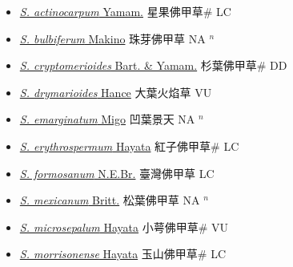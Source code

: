\begin{itemize}
  \begin{itemize}
        \item[] \href{http://www.theplantlist.org/tpl1.1/search?q=Sedum+actinocarpum}{\textit{S. actinocarpum} Yamam.}   星果佛甲草\# LC
        \item[] \href{http://www.theplantlist.org/tpl1.1/search?q=Sedum+bulbiferum}{\textit{S. bulbiferum} Makino}   珠芽佛甲草 NA $^n$
        \item[] \href{http://www.theplantlist.org/tpl1.1/search?q=Sedum+cryptomerioides}{\textit{S. cryptomerioides} Bart. \& Yamam.}   杉葉佛甲草\# DD
        \item[] \href{http://www.theplantlist.org/tpl1.1/search?q=Sedum+drymarioides}{\textit{S. drymarioides} Hance}   大葉火焰草 VU
        \item[] \href{http://www.theplantlist.org/tpl1.1/search?q=Sedum+emarginatum}{\textit{S. emarginatum} Migo}   凹葉景天 NA $^n$
        \item[] \href{http://www.theplantlist.org/tpl1.1/search?q=Sedum+erythrospermum}{\textit{S. erythrospermum} Hayata}   紅子佛甲草\# LC
        \item[] \href{http://www.theplantlist.org/tpl1.1/search?q=Sedum+formosanum}{\textit{S. formosanum} N.E.Br.}   臺灣佛甲草 LC
        \item[] \href{http://www.theplantlist.org/tpl1.1/search?q=Sedum+mexicanum}{\textit{S. mexicanum} Britt.}   松葉佛甲草 NA $^n$
        \item[] \href{http://www.theplantlist.org/tpl1.1/search?q=Sedum+microsepalum}{\textit{S. microsepalum} Hayata}   小萼佛甲草\# VU
        \item[] \href{http://www.theplantlist.org/tpl1.1/search?q=Sedum+morrisonense}{\textit{S. morrisonense} Hayata}   玉山佛甲草\# LC

\end{itemize}
\end{itemize}
